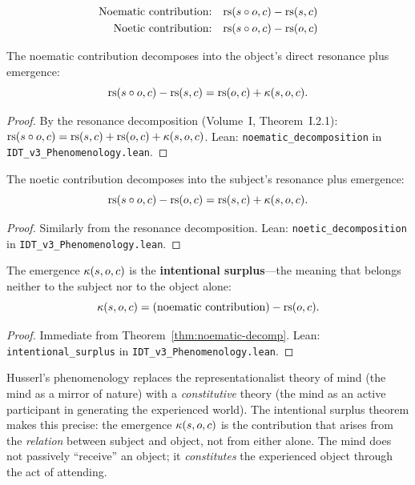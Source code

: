 \begin{definition}
\label{def:noematic-noetic}
\begin{align}
\text{Noematic contribution:} &\quad \mathrm{rs}(s \circ o, c) - \mathrm{rs}(s, c) \\
\text{Noetic contribution:} &\quad \mathrm{rs}(s \circ o, c) - \mathrm{rs}(o, c)
\end{align}
\end{definition}

\begin{theorem}
\label{thm:noematic-decomp}
The noematic contribution decomposes into the object's direct resonance
plus emergence:
\[
\mathrm{rs}(s \circ o, c) - \mathrm{rs}(s, c) = \mathrm{rs}(o, c) + \kappa(s, o, c).
\]
\end{theorem}

\begin{proof}
By the resonance decomposition (Volume~I, Theorem~I.2.1):
$\mathrm{rs}(s \circ o, c) = \mathrm{rs}(s,c) + \mathrm{rs}(o,c) + \kappa(s,o,c)$.
Lean: \texttt{noematic\_decomposition} in \texttt{IDT\_v3\_Phenomenology.lean}.
\end{proof}

\begin{theorem}
\label{thm:noetic-decomp}
The noetic contribution decomposes into the subject's resonance plus emergence:
\[
\mathrm{rs}(s \circ o, c) - \mathrm{rs}(o, c) = \mathrm{rs}(s, c) + \kappa(s, o, c).
\]
\end{theorem}

\begin{proof}
Similarly from the resonance decomposition.
Lean: \texttt{noetic\_decomposition} in \texttt{IDT\_v3\_Phenomenology.lean}.
\end{proof}

\begin{theorem}
\label{thm:intentional-surplus}
The emergence $\kappa(s, o, c)$ is the \textbf{intentional surplus}---the
meaning that belongs neither to the subject nor to the object alone:
\[
\kappa(s, o, c) = (\text{noematic contribution}) - \mathrm{rs}(o, c).
\]
\end{theorem}

\begin{proof}
Immediate from Theorem~\ref{thm:noematic-decomp}.
Lean: \texttt{intentional\_surplus} in \texttt{IDT\_v3\_Phenomenology.lean}.
\end{proof}

\begin{interpretation}
\label{interp:constitution}
Husserl's phenomenology replaces the representationalist theory of mind (the
mind as a mirror of nature) with a \emph{constitutive} theory (the mind as
an active participant in generating the experienced world). The intentional
surplus theorem makes this precise: the emergence $\kappa(s, o, c)$ is the
contribution that arises from the \emph{relation} between subject and object,
not from either alone. The mind does not passively ``receive'' an object; it
\emph{constitutes} the experienced object through the act of attending.
\end{interpretation}

